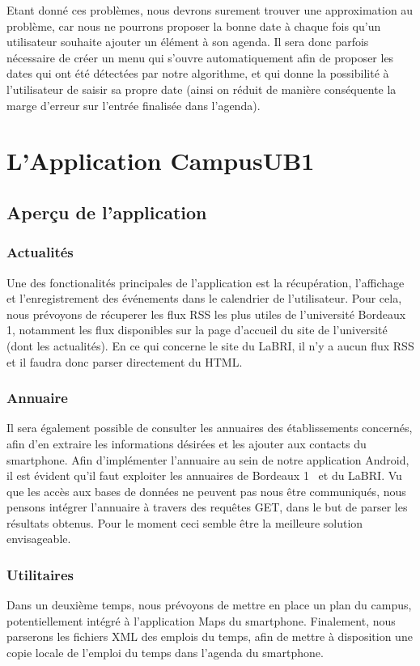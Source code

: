 \documentclass [pdftex,12pt] {report}
\begin{document}
Etant donné ces problèmes, nous devrons surement trouver une approximation au problème, car nous ne pourrons proposer la bonne date à chaque fois qu'un utilisateur souhaite ajouter un élément à son agenda. Il sera donc parfois nécessaire de créer un menu qui s'ouvre automatiquement afin de proposer les dates qui ont été détectées par notre algorithme, et qui donne la possibilité à l'utilisateur de saisir sa propre date (ainsi on réduit de manière conséquente la marge d'erreur sur l'entrée finalisée dans l'agenda).



\chapter{L'Application CampusUB1}
\section{Aperçu de l'application}

\subsection{Actualités}
Une des fonctionalités principales de l'application est la récupération, l'affichage et l'enregistrement des événements dans le calendrier de l'utilisateur. 
Pour cela, nous prévoyons de récuperer les flux RSS les plus utiles de l'université Bordeaux 1\cite{fluxBDX1}, notamment les flux disponibles sur la page d'accueil du site de l'université (dont les actualités).
En ce qui concerne le site du LaBRI, il n'y a aucun flux RSS et il faudra donc parser directement du HTML.

\subsection{Annuaire}
Il sera également possible de consulter les annuaires des établissements concernés, afin d'en extraire les informations désirées et les ajouter aux contacts du smartphone.
Afin d'implémenter l'annuaire au sein de notre application Android, il est évident qu'il faut exploiter les annuaires de Bordeaux 1~\cite{AnnuaireBdx1} et du LaBRI. Vu que les accès aux bases de données ne peuvent pas nous être communiqués, nous pensons intégrer l'annuaire à travers des requêtes GET, dans le but de parser les résultats obtenus. Pour le moment ceci semble être la meilleure solution envisageable.

\subsection{Utilitaires}
Dans un deuxième temps, nous prévoyons de mettre en place un plan du campus, potentiellement intégré à l'application Maps du smartphone.
Finalement, nous parserons les fichiers XML des emplois du temps\cite{EdTxml}, afin de mettre à disposition une copie locale de l'emploi du temps dans l'agenda du smartphone.
\end{document}
